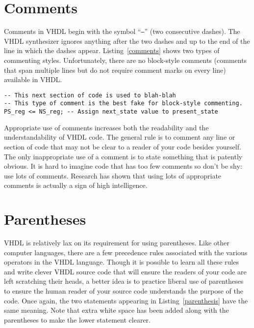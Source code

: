 \section{Comments}
Comments in VHDL begin with the symbol ``\texttt{--}'' (two consecutive dashes). The VHDL synthesizer ignores anything after the two dashes and up to the end of the line in which the dashes appear. Listing~\ref{comments} shows two types of commenting styles. Unfortunately, there are no block-style comments (comments that span multiple lines but do not require comment marks on every line) available in VHDL.

\noindent
\begin{minipage}{0.99\linewidth}
\begin{lstlisting}[label=comments, caption=Two typical uses of comments.]
-- This next section of code is used to blah-blah
-- This type of comment is the best fake for block-style commenting.
PS_reg <= NS_reg; -- Assign next_state value to present_state
\end{lstlisting}
\end{minipage}

Appropriate use of comments increases both the readability and the understandability of VHDL code. The general rule is to comment any line or section of code that may not be clear to a reader of your code besides yourself. The only inappropriate use of a comment is to state something that is patently obvious. It is hard to imagine code that has too few comments so don't be shy: use lots of comments. Research has shown that using lots of appropriate comments is actually a sign of high intelligence.

\section{Parentheses}
VHDL is relatively lax on its requirement for using parentheses. Like other computer languages, there are a few precedence rules associated with the various operators in the VHDL language. Though it is possible to learn all these rules and write clever VHDL source code that will ensure the readers of your code are left scratching their heads, a better idea is to practice liberal use of parentheses to ensure the human reader of your source code understands the purpose of the code. Once again, the two statements appearing in Listing~\ref{parenthesis} have the same meaning. Note that extra white space has been added along with the parentheses to make the lower statement clearer.

